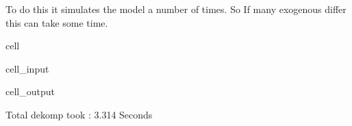 \documentclass[letterpaper,10pt,english]{jupyterBook}
\begin{document}
\sphinxAtStartPar
To do this it simulates the model a number of times. So If many exogenous differ this can take some time.

\begin{sphinxuseclass}{cell}\begin{sphinxVerbatimInput}

\begin{sphinxuseclass}{cell_input}
\begin{sphinxVerbatim}[commandchars=\\\{\}]
  
\end{sphinxVerbatim}

\end{sphinxuseclass}\end{sphinxVerbatimInput}
\begin{sphinxVerbatimOutput}

\begin{sphinxuseclass}{cell_output}
\begin{sphinxVerbatim}[commandchars=\\\{\}]
Total dekomp took       :         3.314 Seconds
\end{sphinxVerbatim}

\end{sphinxuseclass}\end{sphinxVerbatimOutput}

\end{sphinxuseclass}
\end{document}
